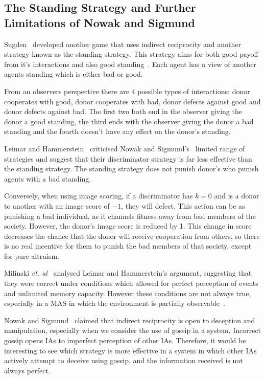 \documentclass[]{final_report}
\begin{document}
\subsection{The Standing Strategy and Further Limitations of Nowak and Sigmund}
Sugden~\cite{sugden2004economics} developed another game that uses indirect reciprocity and another strategy known as the standing strategy. This strategy aims for both good payoff from it's interactions and also good standing~\cite{imagevsstanding}. Each agent has a view of another agents standing which is either bad or good.\par 
From an observers perspective there are 4 possible types of interactions: donor cooperates with good, donor cooperates with bad, donor defects against good and donor defects against bad. The first two both end in the observer giving the donor a good standing, the third ends with the observer giving the donor a bad standing and the fourth doesn't have any effect on the donor's standing.\par 
Leimar and Hammerstein~\cite{leimarhammer} criticised Nowak and Sigmund's~\cite{evol_indirect_image} limited range of strategies and suggest that their discriminator strategy is far less effective than the standing strategy. The standing strategy does not punish donor's who punish agents with a bad standing.\par 
Conversely, when using image scoring, if a discriminator has $k=0$ and is a donor to another with an image score of $-1$, they will defect. This action can be as punishing a bad individual, as it channels fitness away from bad members of the society. However, the donor's image score is reduced by 1. This change in score decreases the chance that the donor will receive cooperation from others, so there is no real incentive for them to punish the bad members of that society, except for pure altruism.\par 
Milinski \textit{et. al}~\cite{imagevsstanding} analysed Leimar and Hammerstein's argument, suggesting that they were correct under conditions which allowed for perfect perception of events and unlimited memory capacity. However these conditions are not always true, especially in a MAS in which the environment is partially observable~\cite{russell2016artificial}.\par
Nowak and Sigmund~\cite{evol_indirect_image} claimed that indirect reciprocity is open to deception and manipulation, especially when we consider the use of gossip in a system. Incorrect gossip opens IAs to imperfect perception of other IAs. Therefore, it would be interesting to see which strategy is more effective in a system in which other IAs actively attempt to deceive using gossip, and the information received is not always perfect.
\end{document}
